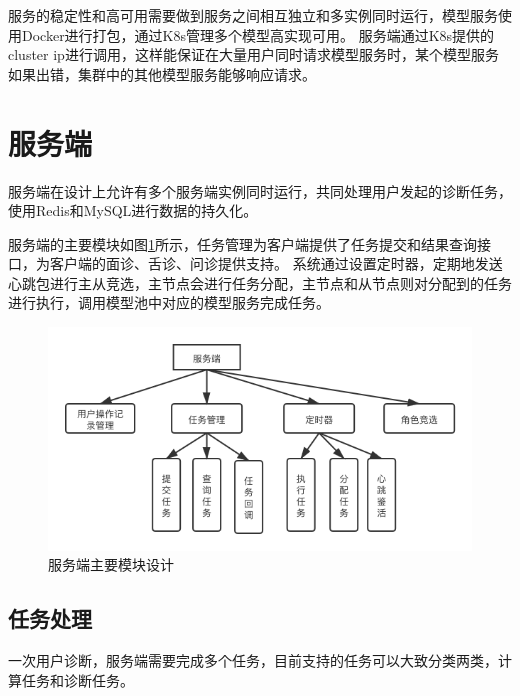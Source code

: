 服务的稳定性和高可用需要做到服务之间相互独立和多实例同时运行，模型服务使用Docker进行打包，通过K8s管理多个模型高实现可用。
服务端通过K8s提供的cluster ip进行调用，这样能保证在大量用户同时请求模型服务时，某个模型服务如果出错，集群中的其他模型服务能够响应请求。


\section{服务端}

服务端在设计上允许有多个服务端实例同时运行，共同处理用户发起的诊断任务，使用Redis和MySQL进行数据的持久化。

服务端的主要模块如图\ref{fig:server}所示，任务管理为客户端提供了任务提交和结果查询接口，为客户端的面诊、舌诊、问诊提供支持。
系统通过设置定时器，定期地发送心跳包进行主从竞选，主节点会进行任务分配，主节点和从节点则对分配到的任务进行执行，调用模型池中对应的模型服务完成任务。


\begin{figure}[ht]
    \centering
    \includegraphics[width=12cm]{images/server7.png}
    \caption{服务端主要模块设计}
    \label{fig:server}
\end{figure}


\subsection{任务处理}
一次用户诊断，服务端需要完成多个任务，目前支持的任务可以大致分类两类，计算任务和诊断任务。


